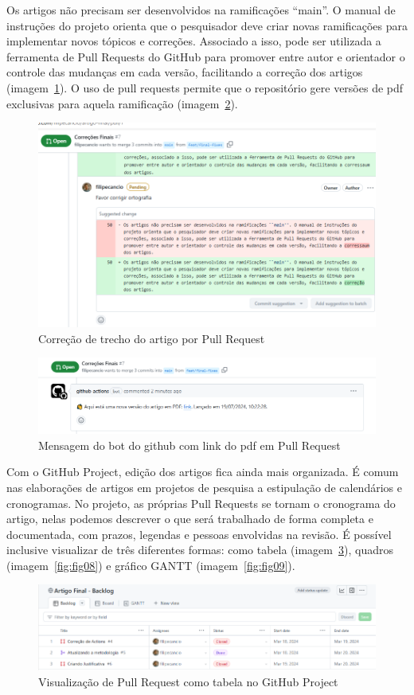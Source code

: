 Os artigos não precisam ser desenvolvidos na ramificações ``main''. O manual de instruções do projeto orienta que o pesquisador deve criar novas ramificações para implementar novos tópicos e correções. Associado a isso, pode ser utilizada a ferramenta de Pull Requests do GitHub para promover entre autor e orientador o controle das mudanças em cada versão, facilitando a correção dos artigos (imagem~\ref{fig:fig05}). O uso de pull requests permite que o repositório gere versões de pdf exclusivas para aquela ramificação (imagem~\ref{fig:fig06}).

\begin{figure}[H]
	\centering
	\includegraphics[width=.6\textwidth]{./images/fig05.png}
	\caption{Correção de trecho do artigo por Pull Request}
	\label{fig:fig05}
\end{figure}

\begin{figure}[H]
	\centering
	\includegraphics[width=.6\textwidth]{./images/fig06.png}
	\caption{Mensagem do bot do github com link do pdf em Pull Request}
	\label{fig:fig06}
\end{figure}

Com o GitHub Project,  edição dos artigos fica ainda mais organizada. É comum nas elaborações de artigos em projetos de pesquisa a estipulação de calendários e cronogramas. No projeto, as próprias Pull Requests se tornam o cronograma do artigo, nelas podemos descrever o que será trabalhado de forma completa e documentada, com prazos, legendas e pessoas envolvidas na revisão. É possível inclusive visualizar de três diferentes formas: como tabela (imagem~\ref{fig:fig07}), quadros (imagem~\ref{fig:fig08}) e gráfico GANTT (imagem~\ref{fig:fig09}).

\begin{figure}[H]
	\centering
	\includegraphics[width=.5\textwidth]{./images/fig07.png}
	\caption{Visualização de Pull Request como tabela no GitHub Project}
	\label{fig:fig07}
\end{figure}

